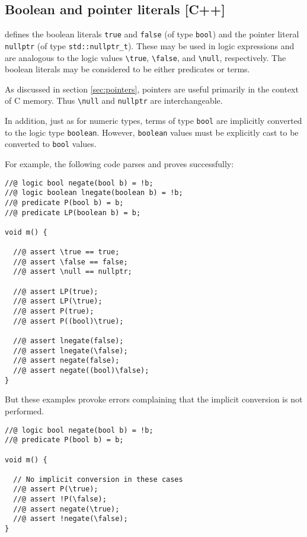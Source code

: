 \subsection{Boolean and pointer literals [C++]}

\lang defines the boolean literals
\lstinline|true| and \lstinline|false| (of type \lstinline|bool|) and the pointer literal \lstinline|nullptr| (of type \lstinline|std::nullptr_t|). 
These may be used in logic expressions and are analogous to the logic values \lstinline|\true|, 
\lstinline|\false|, and \lstinline|\null|, respectively. 
The boolean literals may be considered
to be either predicates or terms.

As discussed in section \ref{sec:pointers}, pointers are useful primarily in
the context of C memory. Thus \lstinline|\null| and \lstinline|nullptr|
are interchangeable.

In addition, just as for numeric types, terms of type \lstinline|bool| are
implicitly converted to the logic type \lstinline|boolean|.
However, \lstinline|boolean| values must be explicitly cast to be
converted to \lstinline|bool| values.

For example, the following code parses and proves successfully:
\begin{lstlisting}
//@ logic bool negate(bool b) = !b;
//@ logic boolean lnegate(boolean b) = !b;
//@ predicate P(bool b) = b;
//@ predicate LP(boolean b) = b;

void m() {

  //@ assert \true == true;
  //@ assert \false == false;
  //@ assert \null == nullptr;

  //@ assert LP(true);
  //@ assert LP(\true);
  //@ assert P(true);
  //@ assert P((bool)\true);

  //@ assert lnegate(false);
  //@ assert lnegate(\false);
  //@ assert negate(false);
  //@ assert negate((bool)\false);
}
\end{lstlisting}

But these examples provoke errors complaining that the implicit conversion
is not performed.
\begin{lstlisting}
//@ logic bool negate(bool b) = !b;
//@ predicate P(bool b) = b;

void m() {

  // No implicit conversion in these cases
  //@ assert P(\true);
  //@ assert !P(\false);
  //@ assert negate(\true);
  //@ assert !negate(\false);
}
\end{lstlisting}
